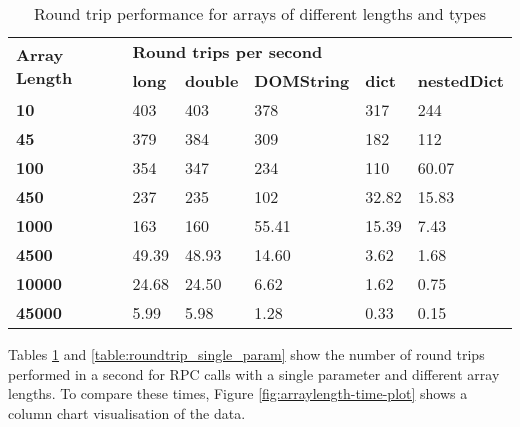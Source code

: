 \begin{table}[h]
\centering
\begin{tabular}{l|lllll}
\multirow{2}{*}{\textbf{Array Length}} & \multicolumn{5}{l}{\textbf{Round trips per second}}                                        \\
                                       & \textbf{long} & \textbf{double} & \textbf{DOMString} & \textbf{dict} & \textbf{nestedDict} \\ \hline
\textbf{10}                            & 403               & 403                 & 378                    & 317               & 244                     \\
\textbf{45}                            & 379               & 384                 & 309                    & 182               & 112                     \\
\textbf{100}                           & 354               & 347                 & 234                    & 110               & 60.07                   \\
\textbf{450}                           & 237               & 235                 & 102                    & 32.82             & 15.83                   \\
\textbf{1000}                          & 163               & 160                 & 55.41                  & 15.39             & 7.43                    \\
\textbf{4500}                          & 49.39             & 48.93               & 14.60                  & 3.62              & 1.68                    \\
\textbf{10000}                         & 24.68             & 24.50               & 6.62                   & 1.62              & 0.75                    \\
\textbf{45000}                         & 5.99              & 5.98                & 1.28                   & 0.33              & 0.15                   
\end{tabular}
\caption{Round trip performance for arrays of different lengths and types}
\label{table:roundtrip_array}
\end{table}

Tables \ref{table:roundtrip_array} and \ref{table:roundtrip_single_param} show the number of round trips performed in a second for RPC calls with a single parameter and different array lengths. To compare these times, Figure \ref{fig:arraylength-time-plot} shows a column chart visualisation of the data.

